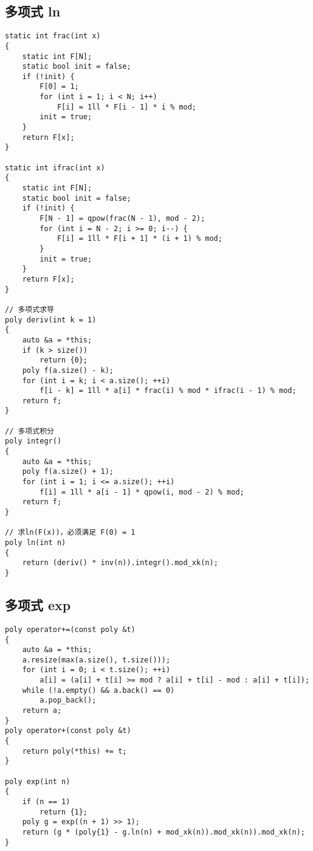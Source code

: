 \documentclass[twocolumn,a4]{article}
\begin{document}
\subsection{多项式 ln}
\begin{lstlisting}
static int frac(int x)
{
    static int F[N];
    static bool init = false;
    if (!init) {
        F[0] = 1;
        for (int i = 1; i < N; i++)
            F[i] = 1ll * F[i - 1] * i % mod;
        init = true;
    }
    return F[x];
}

static int ifrac(int x)
{
    static int F[N];
    static bool init = false;
    if (!init) {
        F[N - 1] = qpow(frac(N - 1), mod - 2);
        for (int i = N - 2; i >= 0; i--) {
            F[i] = 1ll * F[i + 1] * (i + 1) % mod;
        }
        init = true;
    }
    return F[x];
}

// 多项式求导
poly deriv(int k = 1)
{
    auto &a = *this;
    if (k > size())
        return {0};
    poly f(a.size() - k);
    for (int i = k; i < a.size(); ++i)
        f[i - k] = 1ll * a[i] * frac(i) % mod * ifrac(i - 1) % mod;
    return f;
}

// 多项式积分
poly integr()
{
    auto &a = *this;
    poly f(a.size() + 1);
    for (int i = 1; i <= a.size(); ++i)
        f[i] = 1ll * a[i - 1] * qpow(i, mod - 2) % mod;
    return f;
}

// 求ln(F(x))，必须满足 F(0) = 1
poly ln(int n)
{
    return (deriv() * inv(n)).integr().mod_xk(n);
}
\end{lstlisting}

\subsection{多项式 exp}
\begin{lstlisting}
poly operator+=(const poly &t)
{
    auto &a = *this;
    a.resize(max(a.size(), t.size()));
    for (int i = 0; i < t.size(); ++i)
        a[i] = (a[i] + t[i] >= mod ? a[i] + t[i] - mod : a[i] + t[i]);
    while (!a.empty() && a.back() == 0)
        a.pop_back();
    return a;
}
poly operator+(const poly &t)
{
    return poly(*this) += t;
}

poly exp(int n)
{
    if (n == 1)
        return {1};
    poly g = exp((n + 1) >> 1);
    return (g * (poly{1} - g.ln(n) + mod_xk(n)).mod_xk(n)).mod_xk(n);
}
\end{lstlisting}
\end{document}
